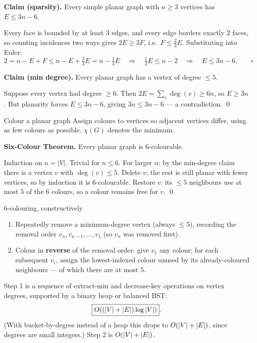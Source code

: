 \begin{correct}
\textbf{Claim (sparsity).} Every simple planar graph with $n\ge3$ vertices has $E\le3n-6$.

\prf Every face is bounded by at least $3$ edges, and every edge borders exactly $2$ faces, so
counting incidences two ways gives $2E\ge3F$, i.e.\ $F\le\tfrac23E$. Substituting into Euler:
\[
  2=n-E+F\le n-E+\tfrac23E=n-\tfrac13E
  \quad\Longrightarrow\quad \tfrac13E\le n-2 \quad\Longrightarrow\quad E\le3n-6 . \qquad\square
\]

\smallskip
\textbf{Claim (min degree).} Every planar graph has a vertex of degree $\le5$.

\prf Suppose every vertex had degree $\ge6$. Then $2E=\sum_v\deg(v)\ge6n$, so $E\ge3n$. But
planarity forces $E\le3n-6$, giving $3n\le3n-6$ --- a contradiction. \qed
\end{correct}

\begin{prob}{Colour a planar graph}
Assign colours to vertices so adjacent vertices differ, using as few colours as possible.
$\chi(G)$ denotes the minimum.
\end{prob}

\begin{correct}
\textbf{Six-Colour Theorem.} Every planar graph is $6$-colourable.

\prf Induction on $n=|V|$. Trivial for $n\le6$. For larger $n$: by the min-degree claim there is
a vertex $v$ with $\deg(v)\le5$. Delete $v$; the rest is still planar with fewer vertices, so by
induction it is $6$-colourable. Restore $v$: its $\le5$ neighbours use at most $5$ of the $6$
colours, so a colour remains free for $v$. \qed
\end{correct}

\begin{algo}{$6$-colouring, constructively}
\begin{enumerate}
  \item Repeatedly remove a minimum-degree vertex (always $\le5$), recording the removal order
        $v_n,v_{n-1},\dots,v_1$ (so $v_n$ was removed first).
  \item Colour in \textbf{reverse} of the removal order: give $v_1$ any colour; for each
        subsequent $v_i$, assign the lowest-indexed colour unused by its already-coloured
        neighbours --- of which there are at most $5$.
\end{enumerate}
\end{algo}

\begin{cplx}
Step 1 is a sequence of extract-min and decrease-key operations on vertex degrees, supported by a
binary heap or balanced BST:
\[
  \boxed{O((|V|+|E|)\log|V|)} .
\]
(With bucket-by-degree instead of a heap this drops to $O(|V|+|E|)$, since degrees are small
integers.) Step 2 is $O(|V|+|E|)$.
\end{cplx}

